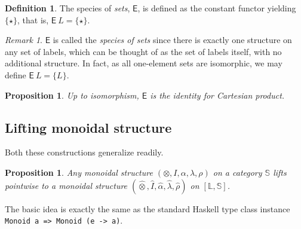 \documentclass[preprint,authoryear]{sigplanconf}
\newcommand{\term}[1]{\emph{#1}}
\newcommand{\bbb}[1]{\ensuremath{\mathbb{#1}}\xspace}
\newcommand{\msf}[1]{\ensuremath{\mathsf{#1}}\xspace}
\newtheorem{prop}[thm]{Proposition}
\theoremstyle{definition}
\newtheorem{defn}[thm]{Definition}
\theoremstyle{remark}
\newtheorem*{rem}{Remark}
\newcommand{\lifted}[1]{\hat{#1}}
\newcommand{\lotimes}{\mathbin{\lifted{\otimes}}}
\providecommand{\Sp}{}
\renewcommand{\Sp}{\msf}
\newcommand{\E}{\Sp{E}}
\newcommand{\Lab}{\bbb{L}}
\newcommand{\Str}{\bbb{S}}
\begin{document}
\begin{defn}
  The species of \emph{sets}, $\E$, is defined as the constant functor
  yielding $\{\star\}$, that is, $\E\ L = \{\star\}$.
\end{defn}

\begin{rem}
  $\E$ is called the \term{species of sets} since there is
  exactly one structure on any set of labels, which can be
  thought of as the set of labels itself, with no additional
  structure.  In fact, as all one-element sets are isomorphic, we
  may define $\E\ L = \{L\}$.
\end{rem}

\begin{prop}
  Up to isomorphism, $\E$ is the identity for Cartesian product.
\end{prop}

\subsection{Lifting monoidal structure}
\label{sec:lifting-monoids}

Both these constructions generalize readily.  
\begin{prop}
Any monoidal structure $(\otimes, I, \alpha, \lambda, \rho)$ on a category
$\Str$ lifts pointwise to a monoidal structure $(\lotimes,
\lifted I, \lifted \alpha, \lifted \lambda, \lifted \rho)$ on 
$[\Lab, \Str]$.
\end{prop}
\noindent The basic idea is exactly the same as the standard Haskell type class
instance \verb|Monoid a => Monoid (e -> a)|.

\end{document}
